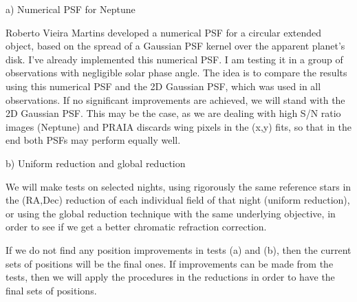 \documentclass[12pt,a4paper]{report}
\begin{document}
a) Numerical PSF for Neptune

Roberto Vieira Martins developed a numerical PSF for a circular extended object, based on the spread of a Gaussian PSF kernel over the apparent planet's disk. I've already implemented this numerical PSF. I am testing it in a group of observations with negligible solar phase angle. The idea is to compare the results using this numerical PSF and the 2D Gaussian PSF, which was used in all observations. If no significant improvements are achieved, we will stand with the 2D Gaussian PSF. This may be the case, as we are dealing with high S/N ratio images (Neptune) and PRAIA discards wing pixels in the (x,y) fits, so that in the end both PSFs may perform equally well.


b) Uniform reduction and global reduction

We will make tests on selected nights, using rigorously the same reference stars in the (RA,Dec) reduction of each individual field of that night (uniform reduction), or using the global reduction technique with the same underlying objective, in order to see if we get a better chromatic refraction correction.


If we do not find any position improvements in tests (a) and (b), then the current sets of positions will be the final ones. If improvements can be made from the tests, then we will apply the procedures in the reductions in order to have the final sets of positions. 




\end{document}
